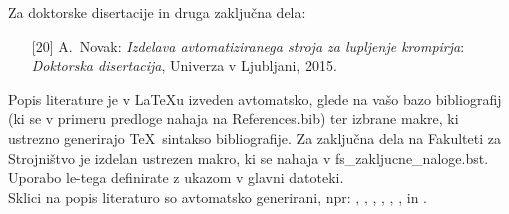 Za doktorske disertacije in druga zaključna dela:
\begin{itemize}
\item[{[20]}] A.~Novak: \emph{Izdelava avtomatiziranega stroja za lupljenje krompirja}:
  \emph{Doktorska disertacija}, Univerza v Ljubljani, 2015.
\end{itemize}

Popis literature je v \LaTeX u izveden avtomatsko, glede na vašo bazo bibliografij (ki se v primeru predloge nahaja na References.bib) ter izbrane makre, ki ustrezno generirajo \TeX~sintakso bibliografije. Za zaključna dela na Fakulteti za Strojništvo je izdelan ustrezen makro, ki se nahaja v fs\_zakljucne\_naloge.bst. Uporabo le-tega definirate z ukazom \verb|| v glavni datoteki.\\

Sklici na popis literaturo so avtomatsko generirani, npr: \cite{bazant_1991}, \cite{Doe_1991},  \cite{Bazant_2008}, \cite{Gonzalez_2014, Bazant_2005} \cite{Bazant_2007, Kogoj_DTD, Merkur_2005, SURS_2009, SURS_2005, MKariera, Encyclopedia, Posl_app, ZGD, ZOP}, \cite{ISO_2573}, \cite{DIN_4768}, \cite{DIN_4768} in \cite{JISB0601, Novak_2015}.





